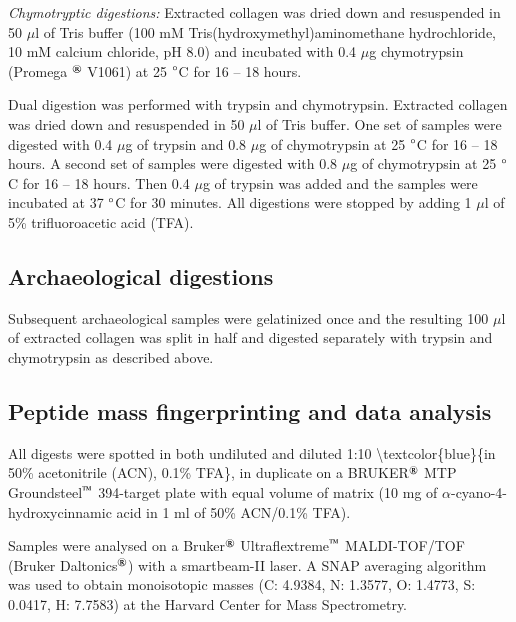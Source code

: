 \documentclass[preprint, 3p, authoryear]{elsarticle} %
\begin{document}
\emph{Chymotryptic digestions:} Extracted collagen was dried down and resuspended in 50 \(\mu\)l of Tris buffer (100 mM Tris(hydroxymethyl)aminomethane hydrochloride, 10 mM calcium chloride, pH 8.0) and incubated with 0.4 \(\mu\)g chymotrypsin (Promega \(^\text{\textregistered}\) V1061) at 25 \(\text{\textdegree}\)C for 16 -- 18 hours.

Dual digestion was performed with trypsin and chymotrypsin. Extracted collagen was dried down and resuspended in 50 \(\mu\)l of Tris buffer. One set of samples were digested with 0.4 \(\mu\)g of trypsin and 0.8 \(\mu\)g of chymotrypsin at 25 \(\text{\textdegree}\)C for 16 -- 18 hours. A second set of samples were digested with 0.8 \(\mu\)g of chymotrypsin at 25 \(\text{\textdegree}\)C for 16 -- 18 hours. Then 0.4 \(\mu\)g of trypsin was added and the samples were incubated at 37 \(\text{\textdegree}\)C for 30 minutes. All digestions were stopped by adding 1 \(\mu\)l of 5\% trifluoroacetic acid (TFA).

\hypertarget{archaeological-digestions}{%
\subsection{Archaeological digestions}\label{archaeological-digestions}}

Subsequent archaeological samples were gelatinized once and the resulting 100 \(\mu\)l of extracted collagen was split in half and digested separately with trypsin and chymotrypsin as described above.

\hypertarget{peptide-mass-fingerprinting-and-data-analysis}{%
\subsection{Peptide mass fingerprinting and data analysis}\label{peptide-mass-fingerprinting-and-data-analysis}}

All digests were spotted in both undiluted and diluted 1:10 \textbackslash textcolor\{blue\}\{in 50\% acetonitrile (ACN), 0.1\% TFA\}, in duplicate on a BRUKER\(^\text{\textregistered}\) MTP Groundsteel\(^\text{\texttrademark}\) 394-target plate with equal volume of matrix (10 mg of \(\alpha\)-cyano-4-hydroxycinnamic acid in 1 ml of 50\% ACN/0.1\% TFA).

Samples were analysed on a Bruker\(^\text{\textregistered}\) Ultraflextreme\(^\text{\texttrademark}\) MALDI-TOF/TOF (Bruker Daltonics\(^\text{\textregistered}\)) with a smartbeam-II laser. A SNAP averaging algorithm was used to obtain monoisotopic masses (C: 4.9384, N: 1.3577, O: 1.4773, S: 0.0417, H: 7.7583) at the Harvard Center for Mass Spectrometry.
\end{document}
